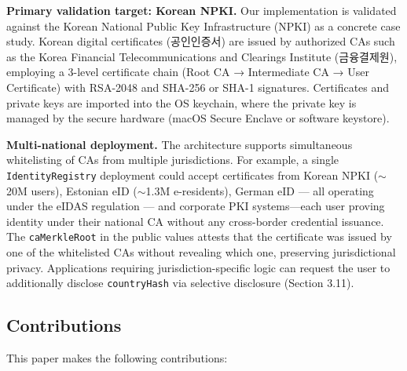 \documentclass[11pt, a4paper]{article}
\begin{document}
\textbf{Primary validation target: Korean NPKI.} Our implementation is
validated against the Korean National Public Key Infrastructure (NPKI)
as a concrete case study. Korean digital certificates (공인인증서) are
issued by authorized CAs such as the Korea Financial Telecommunications
and Clearings Institute (금융결제원), employing a 3-level certificate
chain (Root CA → Intermediate CA → User Certificate) with RSA-2048 and
SHA-256 or SHA-1 signatures. Certificates and private keys are imported
into the OS keychain, where the private key is managed by the secure
hardware (macOS Secure Enclave or software keystore).

\textbf{Multi-national deployment.} The architecture supports
simultaneous whitelisting of CAs from multiple jurisdictions. For
example, a single \texttt{IdentityRegistry} deployment could accept
certificates from Korean NPKI ($\sim$20M users), Estonian eID
($\sim$1.3M e-residents), German eID --- all operating under
the eIDAS regulation \cite{ref26} --- and corporate PKI systems---each user
proving identity under their national CA without any cross-border
credential issuance. The \texttt{caMerkleRoot} in the public values
attests that the certificate was issued by one of the whitelisted CAs
without revealing which one, preserving jurisdictional privacy.
Applications requiring jurisdiction-specific logic can request the user
to additionally disclose \texttt{countryHash} via selective disclosure
(Section 3.11).

\subsection{Contributions}\label{contributions}

This paper makes the following contributions:
\end{document}
